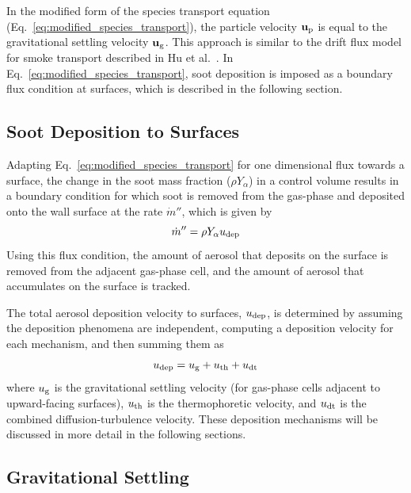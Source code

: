 In the modified form of the species transport equation (Eq.~\ref{eq:modified_species_transport}), the particle velocity $\mathbf{u\sb{p}}$ is equal to the gravitational settling velocity $\mathbf{u\sb{g}}$. This approach is similar to the drift flux model for smoke transport described in Hu et al.~\cite{Hu:1}. In Eq.~\ref{eq:modified_species_transport}, soot deposition is imposed as a boundary flux condition at surfaces, which is described in the following section.

\subsection{Soot Deposition to Surfaces}

Adapting Eq.~\ref{eq:modified_species_transport} for one dimensional flux towards a surface, the change in the soot mass fraction ($\rho Y_{\alpha}$) in a control volume results in a boundary condition for which soot is removed from the gas-phase and deposited onto the wall surface at the rate $\dot m''$, which is given by
\begin{equation}
\dot m'' = \rho Y_\alpha u\sb{dep}
\label{eq:soot_deposition_bc}
\end{equation}
Using this flux condition, the amount of aerosol that deposits on the surface is removed from the adjacent gas-phase cell, and the amount of aerosol that accumulates on the surface is tracked.

The total aerosol deposition velocity to surfaces, $u\sb{dep}$, is determined by assuming the deposition phenomena are independent, computing a deposition velocity for each mechanism, and then summing
them as~\cite{Bixler:1}
\begin{equation}
u\sb{dep} = u\sb{g}+u\sb{th}+u\sb{dt}
\label{eq:total_soot_deposition}
\end{equation}
where $u\sb{g}$ is the gravitational settling velocity (for gas-phase cells adjacent to upward-facing surfaces), $u\sb{th}$ is the thermophoretic velocity, and $u\sb{dt}$ is the combined diffusion-turbulence velocity. These deposition mechanisms will be discussed in more detail in the following sections.

\subsection{Gravitational Settling}
\label{sec:gravitational_settling}


